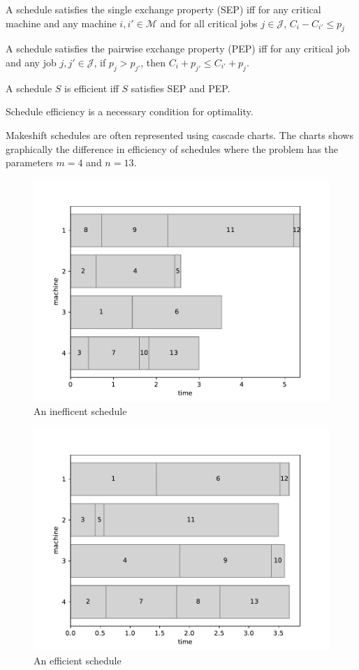 \begin{definition}
	A schedule satisfies the single exchange property (SEP) iff for any critical machine and any machine $i,i'\in\mathcal{M}$ and for all critical jobs $j\in\mathcal{J}$, $C_i-C_{i'}\leq p_j$
\end{definition}

\begin{definition}
	A schedule satisfies the pairwise exchange property (PEP) iff for any critical job and any job $j,j'\in\mathcal{J}$, if $p_j>p_{j'}$, then $C_i+p_{j'}\leq C_{i'}+p_j$.
\end{definition}

\begin{definition}
	A schedule $S$ is efficient iff $S$ satisfies SEP and PEP.
\end{definition}

\begin{theorem}
	Schedule efficiency is a necessary condition for optimality.
\end{theorem}

Makeshift schedules are often represented using cascade charts. The charts shows graphically the difference in efficiency of schedules where the problem has the parameters $m=4$ and $n=13$.

\begin{figure}[H]
	\begin{center}
		\includegraphics[width=.6\linewidth]{figures/makeshift1.pdf}
	\end{center}
	\caption{An inefficent schedule}
\end{figure}

\begin{figure}[H]
	\begin{center}
		\includegraphics[width=.6\linewidth]{figures/makeshift2.pdf}	
	\end{center}
	\caption{An efficient schedule}
\end{figure}

